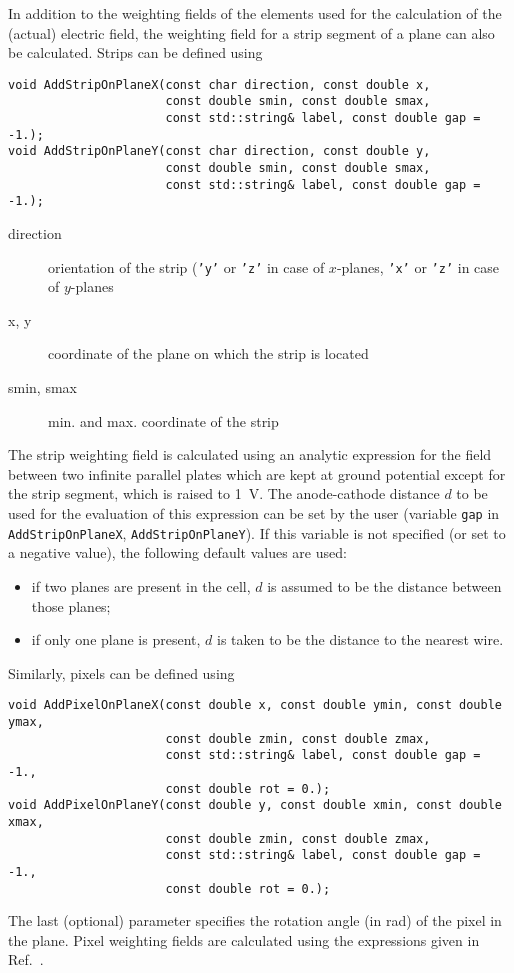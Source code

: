 In addition to the weighting fields of 
the elements used for the calculation of the 
(actual) electric field, 
the weighting field for a strip segment of a plane 
can also be calculated. 
Strips can be defined using
\begin{lstlisting}
void AddStripOnPlaneX(const char direction, const double x,
                      const double smin, const double smax,
                      const std::string& label, const double gap = -1.);
void AddStripOnPlaneY(const char direction, const double y,
                      const double smin, const double smax,
                      const std::string& label, const double gap = -1.);
\end{lstlisting} 
\begin{description}
  \item[direction]
  orientation of the strip (\texttt{'y'} or \texttt{'z'} 
  in case of \(x\)-planes, \texttt{'x'} or \texttt{'z'} 
  in case of \(y\)-planes
  \item[x, y] coordinate of the plane on which the strip is located
  \item[smin, smax] min. and max. coordinate of the strip
\end{description}
The strip weighting field is calculated using an analytic expression for  
the field between two infinite parallel plates which are kept at 
ground potential except for the strip segment, which is raised to 1~V.
The anode-cathode distance \(d\) to be used for the evaluation of this 
expression can be set by the user (variable \texttt{gap} in 
\texttt{AddStripOnPlaneX}, \texttt{AddStripOnPlaneY}). 
If this variable is not specified (or set to a negative value), 
the following default values are used:
\begin{itemize}
  \item
  if two planes are present in the cell, \(d\) is  
  assumed to be the distance between those planes;
  \item
  if only one plane is present, \(d\) is taken to be 
  the distance to the nearest wire.
\end{itemize}

Similarly, pixels can be defined using
\begin{lstlisting}
void AddPixelOnPlaneX(const double x, const double ymin, const double ymax,
                      const double zmin, const double zmax,
                      const std::string& label, const double gap = -1., 
                      const double rot = 0.);
void AddPixelOnPlaneY(const double y, const double xmin, const double xmax,
                      const double zmin, const double zmax,
                      const std::string& label, const double gap = -1.,
                      const double rot = 0.);
\end{lstlisting}
The last (optional) parameter specifies the rotation angle (in rad) of the pixel in the plane.
Pixel weighting fields are calculated using the expressions given in 
Ref.~\cite{Riegler2014}.

